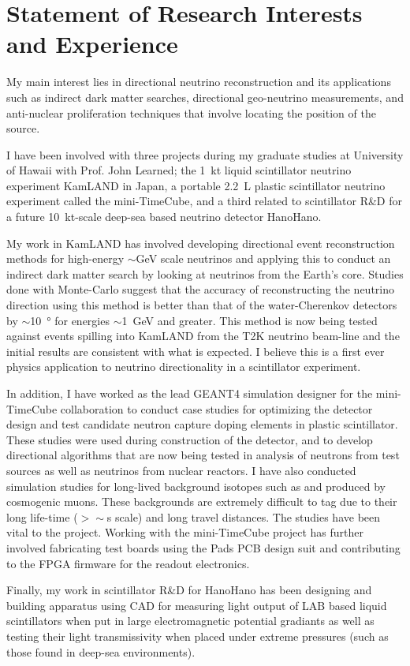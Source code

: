 \documentclass[a4paper,10pt]{article} %
\begin{document}
\section{Statement of Research Interests and Experience}
My main interest lies in directional neutrino reconstruction and its
applications such as indirect dark matter searches, directional geo-neutrino
measurements, and anti-nuclear proliferation techniques that involve locating
the position of the source.

I have been involved with three projects during my graduate studies at
University of Hawaii with Prof. John Learned; the \SI{1}{\kilo\tonne} liquid
scintillator neutrino experiment KamLAND in Japan, a portable
\SI{2.2}{\liter} plastic scintillator neutrino experiment called the
mini-TimeCube, and a third related to scintillator R\&D for a
future \SI{10}{\kilo\tonne}-scale deep-sea based neutrino detector HanoHano.

My work in KamLAND has involved developing directional event reconstruction
methods for high-energy $\sim$\si{\giga\electronvolt} scale neutrinos and
applying this to conduct an indirect dark matter search by looking at neutrinos
from the Earth's core.
Studies done with Monte-Carlo suggest that the accuracy of reconstructing the
neutrino direction using this method is better than that of the
water-Cherenkov detectors by $\sim$\SI{10}{\degree} for energies
$\sim$\SI{1}{\giga\electronvolt} and greater.
This method is now being tested against events spilling into KamLAND from the
T2K neutrino beam-line and the initial results are consistent with what is
expected.
I believe this is a first ever physics application to neutrino directionality in
a scintillator experiment.

In addition, I have worked as the lead GEANT4 simulation designer for the
mini-TimeCube collaboration to conduct case studies for optimizing the detector
design and test candidate neutron capture doping elements in plastic
scintillator.
These studies were used during construction of the detector, and to develop
directional algorithms that are now being tested in analysis of neutrons from
test sources as well as neutrinos from nuclear reactors.
I have also conducted simulation studies for long-lived background isotopes such
as  and  produced by cosmogenic muons.
These backgrounds are extremely difficult to tag due to their long life-time
($>\sim$\si{\second} scale) and long travel distances.
The studies have been vital to the project.
Working with the mini-TimeCube project has further involved fabricating test
boards using the Pads PCB design suit and contributing to the FPGA firmware for
the readout electronics.

Finally, my work in scintillator R\&D for HanoHano has been designing and
building apparatus using CAD for measuring light output of LAB based liquid
scintillators when put in large electromagnetic potential gradiants as well as
testing their light transmissivity when placed under extreme pressures (such as
those found in deep-sea environments).

\end{document}
